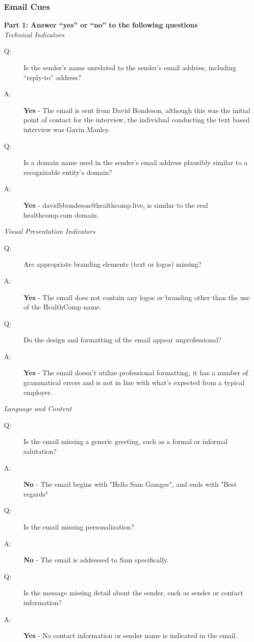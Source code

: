 \begin{fullwidth}
\subsubsection{Email Cues} %

\textbf{Part 1: Answer “yes” or “no” to the following questions}\\\medskip
\textit{Technical Indicators}
    \begin{description}
        \item[Q:] Is the sender’s name unrelated to the sender’s email address, including “reply-to” address?
        \item[A:] \textbf{Yes} - The email is sent from David Bondeson, although this was the initial point of contact for the interview, the individual conducting the text based interview was Gavin Manley.
        \item[Q:] Is a domain name used in the sender's email address plausibly similar to a
recognizable entity's domain?
        \item[A:] \textbf{Yes} - davidbbondeson@healthcomp.live, is similar to the real healthcomp.com domain.
    \end{description}

\textit{Visual Presentation Indicators}
\begin{description}
    \item[Q:] Are appropriate branding elements (text or logos) missing?
    \item[A:] \textbf{Yes} - The email does not contain any logos or branding other than the use of the HealthComp name.
    \item[Q:] Do the design and formatting of the email appear unprofessional?
    \item[A:] \textbf{Yes} - The email doesn't utilize professional formatting, it has a number of grammatical errors and is not in line with what's expected from a typical employer.
\end{description}

\textit{Language and Content}
\begin{description}
    \item[Q:] Is the email missing a generic greeting, such as a formal or informal
salutation?
    \item[A:] \textbf{No} - The email begins with "Hello Sam Gamgee", and ends with "Best regards"
    \item[Q:] Is the email missing personalization?
    \item[A:] \textbf{No} -  The email is addressed to Sam specifically.
    \item[Q:] Is the message missing detail about the sender, such as sender or contact
information?
    \item[A:] \textbf{Yes} - No contact information or sender name is indicated in the email.
\end{description}


\end{fullwidth}
